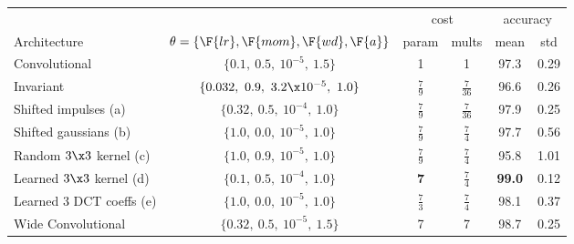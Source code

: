 \begin{table}[hbt]
  \renewcommand{\arraystretch}{1.4}
  \centering
  \label{tab:ch5:mnist_new_results}
  \begin{tabular}{@{}l c c c c c@{}}
    \toprule
    & & \multicolumn{2}{c}{cost} & \multicolumn{2}{c}{accuracy} \\\cline{3-4}\cline{5-6}
    Architecture & $\theta = \{\F{lr}, \F{mom}, \F{wd}, \F{a}\}$ & param & mults & mean & std  \\\midrule
    Convolutional & $\{0.1,\ 0.5,\ 10^{-5},\ 1.5 \}$ & 1 & 1 & 97.3 & 0.29 \\
    Invariant & $\{0.032,\ 0.9,\ 3.2\x 10^{-5},\ 1.0 \}$ & $\frac{7}{9}$ & $\frac{7}{36}$ & 96.6 & 0.26 \\\midrule
    Shifted impulses (a) & $\{0.32,\ 0.5,\ 10^{-4},\ 1.0 \}$ & $\frac{7}{9}$ & $\frac{7}{36}$ & 97.9 & 0.25 \\
    Shifted gaussians (b) & $\{1.0,\ 0.0,\ 10^{-5},\ 1.0 \}$ & $\frac{7}{9}$ & $\frac{7}{4}$ & 97.7 & 0.56\\
    Random $3\x3$ kernel (c) & $\{1.0,\ 0.9,\  10^{-5},\ 1.0 \}$ & $\frac{7}{9}$ & $\frac{7}{4}$ & 95.8 & 1.01\\
    Learned $3\x3$ kernel (d) & $\{0.1,\ 0.5,\  10^{-4},\ 1.0 \}$ & \textbf{7} & $\frac{7}{4}$ & \textbf{99.0} & 0.12 \\
    Learned 3 DCT coeffs (e) & $\{1.0,\ 0.0,\ 10^{-5},\ 1.0 \}$ & $\frac{7}{3}$ & $\frac{7}{4}$ & 98.1 & 0.37\\\midrule
    Wide Convolutional & $\{0.32,\ 0.5,\ 10^{-5},\ 1.5 \}$ & 7 & 7 & 98.7 & 0.25  \\
    \bottomrule
  \end{tabular}
\end{table}


